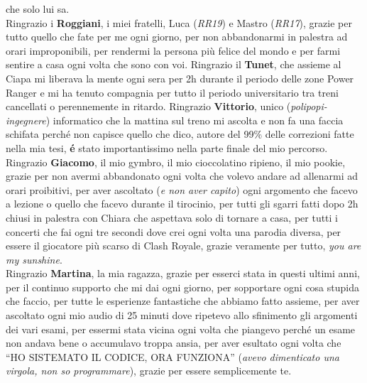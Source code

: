che solo lui sa.  \\

\noindent Ringrazio i \textbf{Roggiani}, i miei fratelli, Luca (\textit{RR19}) e Mastro (\textit{RR17}), grazie per tutto quello che fate per me ogni giorno, per non abbandonarmi in palestra ad orari improponibili, per rendermi la persona più felice del mondo e per farmi sentire a casa ogni volta che sono con voi. Ringrazio il \textbf{Tunet}, che assieme al Ciapa mi liberava la mente ogni sera per 2h durante il periodo delle zone Power Ranger e mi ha tenuto compagnia per tutto il periodo universitario tra treni cancellati o perennemente in ritardo. Ringrazio \textbf{Vittorio}, unico (\textit{polipopi-ingegnere}) informatico che la mattina sul treno mi ascolta e non fa una faccia schifata perché non capisce quello che dico, autore del 99\% delle correzioni fatte nella mia tesi, \textbf{é} stato importantissimo nella parte finale del mio percorso. Ringrazio \textbf{Giacomo}, il mio gymbro, il mio cioccolatino ripieno, il mio pookie, grazie per non avermi abbandonato ogni volta che volevo andare ad allenarmi ad orari proibitivi, per aver ascoltato (\textit{e non aver capito}) ogni argomento che facevo a lezione o quello che facevo durante il tirocinio, per tutti gli sgarri fatti dopo 2h chiusi in palestra con Chiara che aspettava solo di tornare a casa, per tutti i concerti che fai ogni tre secondi dove crei ogni volta una parodia diversa, per essere il giocatore più scarso di Clash Royale, grazie veramente per tutto, \textit{you are my sunshine}. \\

\noindent Ringrazio \textbf{Martina}, la mia ragazza, grazie per esserci stata in questi ultimi anni, per il continuo supporto che mi dai ogni giorno, per sopportare ogni cosa stupida che faccio, per tutte le esperienze fantastiche che abbiamo fatto assieme, per aver ascoltato ogni mio audio di 25 minuti dove ripetevo allo sfinimento gli argomenti dei vari esami, per essermi stata vicina ogni volta che piangevo perché un esame non andava bene o accumulavo troppa ansia, per aver esultato ogni volta che ``HO SISTEMATO IL CODICE, ORA FUNZIONA'' (\textit{avevo dimenticato una virgola, non so programmare}), grazie per essere semplicemente te. \\

